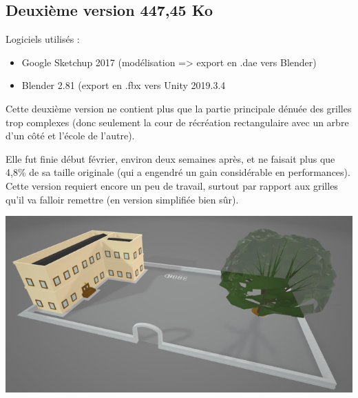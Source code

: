 \documentclass{article}
\begin{document}
\begin{figure}[htp] 
    \centering
    \hfill%
\end{figure}

\subsection{Deuxième version 447,45 Ko}
Logiciels utilisés :
\begin{itemize}
    \item Google Sketchup 2017 (modélisation => export en .dae vers Blender)
    \item Blender 2.81 (export en .fbx vers Unity 2019.3.4
\end{itemize}

Cette deuxième version ne contient plus que la partie principale dénuée des grilles trop complexes (donc seulement la cour de récréation rectangulaire avec un arbre d’un côté et l’école de l’autre).

Elle fut finie début février, environ deux semaines après, et ne faisait plus que 4,8\% de sa taille 	originale (qui a engendré un gain considérable en performances).
Cette version requiert encore un peu de travail, surtout par rapport aux grilles qu’il va falloir 	remettre (en version simplifiée bien sûr).

\begin{center}
\includegraphics[width=0.8\linewidth]{report/map2.png}\\
\end{center}
\end{document}

